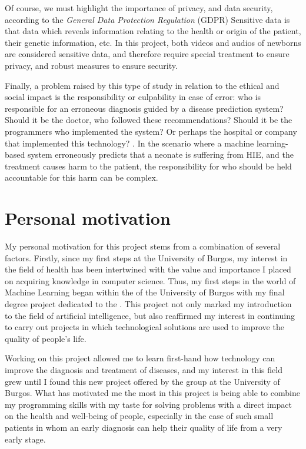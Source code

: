 Of course, we must highlight the importance of privacy, and data security, according to the \textit{General Data Protection Regulation} (GDPR) \cite{EU2016} Sensitive data is that data which reveals information relating to the health or origin of the patient, their genetic information, etc. In this project, both videos and audios of newborns are considered sensitive data, and therefore require special treatment to ensure privacy, and robust measures to ensure security. 

Finally, a problem raised by this type of study in relation to the ethical and social impact is the responsibility or culpability in case of error: who is responsible for an erroneous diagnosis guided by a disease prediction system? Should it be the doctor, who followed these recommendations? Should it be the programmers who implemented the system? Or perhaps the hospital or company that implemented this technology? \cite{Naik2022, Griffin2021, MolnarGabor2020}. In the scenario where a machine learning-based system erroneously predicts that a neonate is suffering from HIE, and the treatment causes harm to the patient, the responsibility for who should be held accountable for this harm can be complex.


\section{Personal motivation}
My personal motivation for this project stems from a combination of several factors. Firstly, since my first steps at the University of Burgos, my interest in the field of health has been intertwined with the value and importance I placed on acquiring knowledge in computer science. Thus, my first steps in the world of Machine Learning began within the  of the University of Burgos with my final degree project dedicated to the  . This project not only marked my introduction to the field of artificial intelligence, but also reaffirmed my interest in continuing to carry out projects in which technological solutions are used to improve the quality of people’s life.
 
Working on this project allowed me to learn first-hand how technology can improve the diagnosis and treatment of diseases, and my interest in this field grew until I found this new project offered by the  group at the University of Burgos. What has motivated me the most in this project is being able to combine my programming skills with my taste for solving problems with a direct impact on the health and well-being of people, especially in the case of such small patients in whom an early diagnosis can help their quality of life from a very early stage.
 

